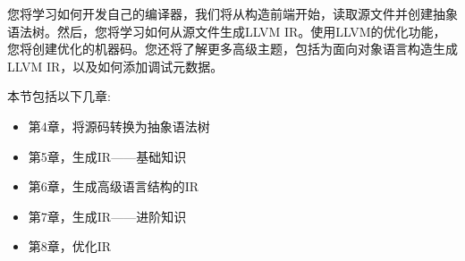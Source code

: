 

您将学习如何开发自己的编译器，我们将从构造前端开始，读取源文件并创建抽象语法树。然后，您将学习如何从源文件生成LLVM IR。使用LLVM的优化功能，您将创建优化的机器码。您还将了解更多高级主题，包括为面向对象语言构造生成LLVM IR，以及如何添加调试元数据。\par

本节包括以下几章:\par

\begin{itemize}
\item 第4章，将源码转换为抽象语法树
\item 第5章，生成IR——基础知识
\item 第6章，生成高级语言结构的IR
\item 第7章，生成IR——进阶知识
\item 第8章，优化IR
\end{itemize}

\newpage